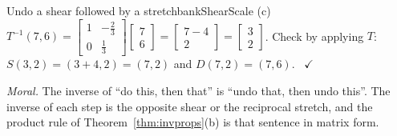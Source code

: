 \documentclass[11pt]{article}
\begin{document}
\begin{exmp}{Undo a shear followed by a stretch}{bankShearScale}
(c)~$T^{-1}(7,6)=\begin{bmatrix}1&-\tfrac23\\0&\tfrac13\end{bmatrix}\begin{bmatrix}7\\6\end{bmatrix}=\begin{bmatrix}7-4\\2\end{bmatrix}=\begin{bmatrix}3\\2\end{bmatrix}$. Check by applying $T$: $S(3,2)=(3+4,2)=(7,2)$ and $D(7,2)=(7,6)$. \ $\checkmark$

\emph{Moral.} The inverse of ``do this, then that'' is ``undo that, then undo this''. The inverse of each step is the opposite shear or the reciprocal stretch, and the product rule of Theorem~\ref{thm:invprops}(b) is that sentence in matrix form.
\end{exmp}
\end{document}
